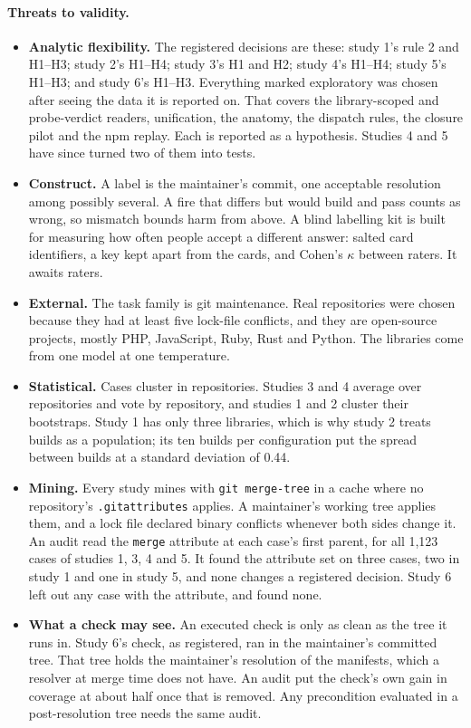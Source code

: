 \documentclass[11pt]{article}
\newcommand{\code}[1]{\texttt{#1}}
\begin{document}
\paragraph{Threats to validity.}
\begin{itemize}
  \item \textbf{Analytic flexibility.} The registered decisions are these: study 1's rule 2 and
  H1--H3; study 2's H1--H4; study 3's H1 and H2; study 4's H1--H4; study 5's H1--H3; and
  study 6's H1--H3. Everything
  marked exploratory was chosen after seeing the data it is reported on. That covers the
  library-scoped and probe-verdict readers, unification, the anatomy, the dispatch rules, the
  closure pilot and the npm replay. Each is reported as a hypothesis. Studies 4 and 5 have since
  turned two of them into tests.
  \item \textbf{Construct.} A label is the maintainer's commit, one acceptable resolution among
  possibly several. A fire that differs but would build and pass counts as wrong, so mismatch
  bounds harm from above. A blind labelling kit is built for measuring how often people accept a
  different answer: salted card identifiers, a key kept apart from the cards, and Cohen's
  $\kappa$ between raters. It awaits raters.
  \item \textbf{External.} The task family is git maintenance. Real repositories were chosen
  because they had at least five lock-file conflicts, and they are open-source projects, mostly
  PHP, JavaScript, Ruby, Rust and Python. The libraries come from one model at one temperature.
  \item \textbf{Statistical.} Cases cluster in repositories. Studies 3 and 4 average over
  repositories and vote by repository, and studies 1 and 2 cluster their bootstraps. Study 1 has
  only three libraries, which is why study 2 treats builds as a population; its ten builds per
  configuration put the spread between builds at a standard deviation of 0.44.
  \item \textbf{Mining.} Every study mines with \code{git merge-tree} in a cache where no
  repository's \code{.gitattributes} applies. A maintainer's working tree applies them, and a lock
  file declared binary conflicts whenever both sides change it. An audit read the \code{merge}
  attribute at each case's first parent, for all 1,123 cases of studies 1, 3, 4 and 5. It found
  the attribute set on three cases, two in study 1 and one in study 5, and none changes a registered
  decision. Study 6 left out any case with the attribute, and found none.
  \item \textbf{What a check may see.} An executed check is only as clean as the tree it runs
  in. Study 6's check, as registered, ran in the maintainer's committed tree. That tree holds
  the maintainer's resolution of the manifests, which a resolver at merge time does not have.
  An audit put the check's own gain in coverage at about half once that is removed. Any
  precondition evaluated in a post-resolution tree needs the same audit.
\end{itemize}
\end{document}

